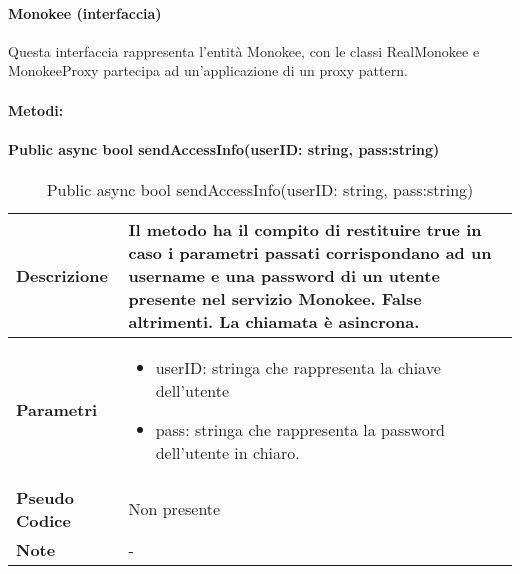 \paragraph{Monokee (interfaccia)}
Questa interfaccia rappresenta l’entità Monokee, con le classi RealMonokee e MonokeeProxy partecipa ad un’applicazione di un proxy pattern.

\paragraph{Metodi:}
\paragraph{Public async bool sendAccessInfo(userID: string, pass:string)}
        \begin{center}
            \begin{longtable}{|p{3cm}|p{9cm}|}%
            \caption{Public async bool sendAccessInfo(userID: string, pass:string)}
            \endfirsthead
            \endhead
            \hline
            \textbf{Descrizione} & Il metodo ha il compito di restituire true in caso i parametri passati corrispondano ad un username e una password di un utente presente nel servizio Monokee. False altrimenti. La chiamata è asincrona.\\
            \hline
            \textbf{Parametri} &      
            \begin{itemize}
                \item userID: stringa che rappresenta la chiave dell’utente
                \item pass: stringa che rappresenta la password dell’utente in chiaro.
            \end{itemize}
            \\
            \hline
            \textbf{Pseudo Codice} & 
            Non presente
            \\
            \hline
            \textbf{Note} & 
            -
            \\
            \hline
            \end{longtable}
            \end{center}




